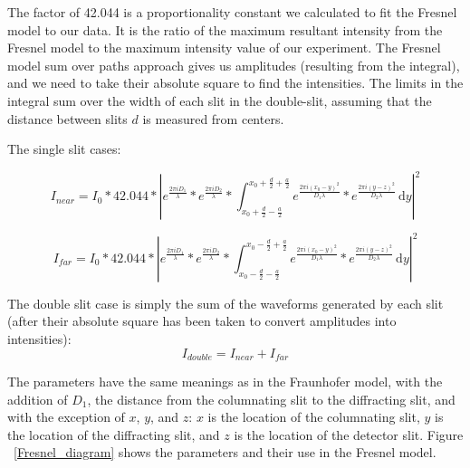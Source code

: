 \documentclass[prb,preprint]{revtex4-1}
\begin{document}
The factor of 42.044 is a proportionality constant we calculated to fit the Fresnel model to our data.  It is the ratio of the maximum resultant intensity from the Fresnel model to the maximum intensity value of our experiment.  The Fresnel model sum over paths approach gives us amplitudes (resulting from the integral), and we need to take their absolute square to find the intensities.  The limits in the integral sum over the width of each slit in the double-slit, assuming that the distance between slits $d$ is measured from centers. 

The single slit cases:

\begin{equation}
I_{near}=I_{0}*42.044*|e^{\frac{2 \pi i D_{1}}{\lambda}}*e^{\frac{2 \pi i D_{2}}{\lambda}}*\int_{x_{0}+\frac{d}{2}-\frac{a}{2}}^{x_{0}+\frac{d}{2}+\frac{a}{2}} \! e^{\frac{2 \pi i (x_{0}-y)^{2}}{D_{1} \lambda}}*e^{\frac{2 \pi i (y-z)^{2}}{D_{2} \lambda}} \, \mathrm{d}y |^{2}
\end{equation}

\begin{equation}
I_{far}=I_{0}*42.044*|e^{\frac{2 \pi i D_{1}}{\lambda}}*e^{\frac{2 \pi i D_{2}}{\lambda}}*\int_{x_{0}-\frac{d}{2}-\frac{a}{2}}^{x_{0}-\frac{d}{2}+\frac{a}{2}} \! e^{\frac{2 \pi i (x_{0}-y)^{2}}{D_{1} \lambda}}*e^{\frac{2 \pi i (y-z)^{2}}{D_{2} \lambda}} \, \mathrm{d}y |^{2}
\end{equation}

The double slit case is simply the sum of the waveforms generated by each slit (after their absolute square has been taken to convert amplitudes into intensities): 
\begin{equation}
I_{double}=I_{near}+I_{far}
\end{equation}


The parameters have the same meanings as in the Fraunhofer model, with the addition of $D_1$, the distance from the columnating slit to the diffracting slit, and with the exception of $x$, $y$, and $z$: $x$ is the location of the columnating slit, $y$ is the location of the diffracting slit, and $z$ is the location of the detector slit.  Figure ~\ref{Fresnel_diagram} shows the parameters and their use in the Fresnel model.  
\end{document}
